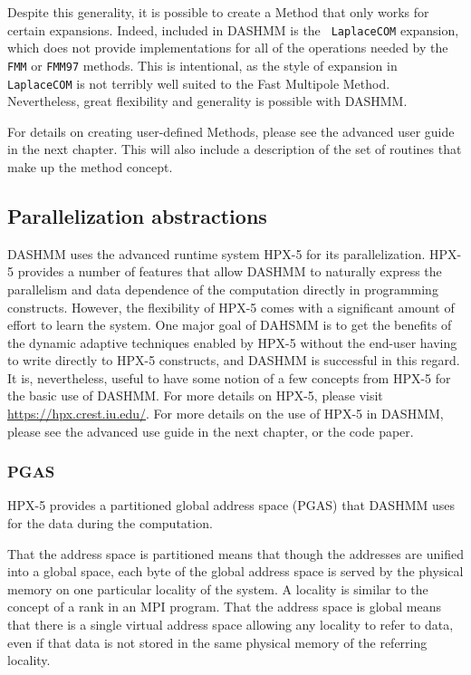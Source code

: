 \documentclass[11pt]{book}
\begin{document}
Despite this generality, it is possible to create a Method that only
works for certain expansions. Indeed, included in DASHMM is the {\tt
  LaplaceCOM} expansion, which does not provide implementations for
all of the operations needed by the {\tt FMM} or {\tt FMM97}
methods. This is intentional, as the style of expansion in {\tt
  LaplaceCOM} is not terribly well suited to the Fast Multipole
Method. Nevertheless, great flexibility and generality is possible
with DASHMM. 

For details on creating user-defined Methods, please see the advanced
user guide in the next chapter. This will also include a description
of the set of routines that make up the method concept. 

\subsection{Parallelization abstractions} 
DASHMM uses the advanced runtime system HPX-5 for its
parallelization. HPX-5 provides a number of features that allow DASHMM
to naturally express the parallelism and data dependence of the
computation directly in programming constructs. However, the
flexibility of HPX-5 comes with a significant amount of effort to
learn the system. One major goal of DAHSMM is to get the benefits of
the dynamic adaptive techniques enabled by HPX-5 without the end-user
having to write directly to HPX-5 constructs, and DASHMM is successful
in this regard. It is, nevertheless, useful to have some notion of a
few concepts from HPX-5 for the basic use of DASHMM. For more details
on HPX-5, please visit \url{https://hpx.crest.iu.edu/}. For more
details on the use of HPX-5 in DASHMM, please see the advanced use
guide in the next chapter, or the code paper. 

\subsubsection{PGAS} 
HPX-5 provides a partitioned global address space (PGAS) that DASHMM uses for
the data during the computation.

That the address space is partitioned means that though the addresses are
unified into a global space, each byte of the global address space is served
by the physical memory on one particular locality of the system. A locality
is similar to the concept of a rank in an MPI program. That the address space
is global means that there is a single virtual address space allowing any
locality to refer to data, even if that data is not stored in the same physical
memory of the referring locality.
\end{document}
